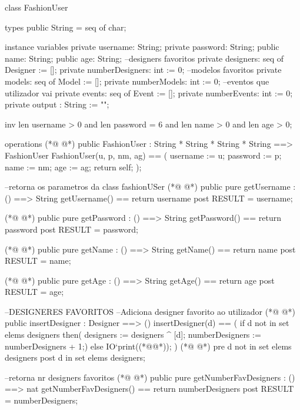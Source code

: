 \begin{vdmpp}[breaklines=true]
class FashionUser

types
 public String = seq of char;
 
instance variables
 private username: String;
 private password: String;
 public name: String;
 public age: String;
 --designers favoritos
 private  designers: seq of Designer := [];
 private  numberDesigners: int := 0;
  --modelos favoritos
 private  models: seq of Model := [];
 private  numberModels: int := 0;
 --eventos que utilizador vai
 private events: seq of Event := [];
 private  numberEvents: int := 0;
 private output : String := "";
 
 inv len username > 0 and len password = 6 and len name > 0 and len age > 0;


operations  
(*@
\label{FashionUser:26}
@*)
  public FashionUser : String *
            String *
            String *
            String  ==> FashionUser
  FashionUser(u, p, nm, ag) ==
  (
   username := u;
   password := p;
    name := nm;
    age := ag;
    return self;
  );
  
  --retorna os parametros da class fashionUSer
(*@
\label{getUsername:40}
@*)
  public pure getUsername : () ==> String
    getUsername() == return username
    post RESULT = username;
    
(*@
\label{getPassword:44}
@*)
  public pure getPassword : () ==> String
    getPassword() == return password
    post RESULT = password;
  
(*@
\label{getName:48}
@*)
  public pure getName : () ==> String
    getName() == return name
    post RESULT = name;
    
(*@
\label{getAge:52}
@*)
  public pure getAge : () ==> String
  getAge() == return age
  post RESULT = age;   
  
   
    --DESIGNERES FAVORITOS  
   --Adiciona designer favorito ao utilizador
(*@
\label{insertDesigner:59}
@*)
  public insertDesigner : Designer ==> ()
   insertDesigner(d) ==
   (
     if d not in set elems designers 
     then(
      designers := designers ^ [d];
      numberDesigners := numberDesigners + 1;)
      else
       IO`print((*@@*));
    )
(*@
\label{getNumberFavDesigners:69}
@*)
   pre d not in set elems designers
   post d in set elems designers;
   
  --retorna nr designers favoritos
(*@
\label{getDesigners:73}
@*)
   public pure getNumberFavDesigners : () ==> nat
   getNumberFavDesigners() == return numberDesigners
   post RESULT = numberDesigners;
    

\end{vdmpp}
